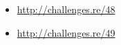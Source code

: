 \section{\Exercises}

\begin{itemize}
	\item \url{http://challenges.re/48}
	\item \url{http://challenges.re/49}
\end{itemize}

